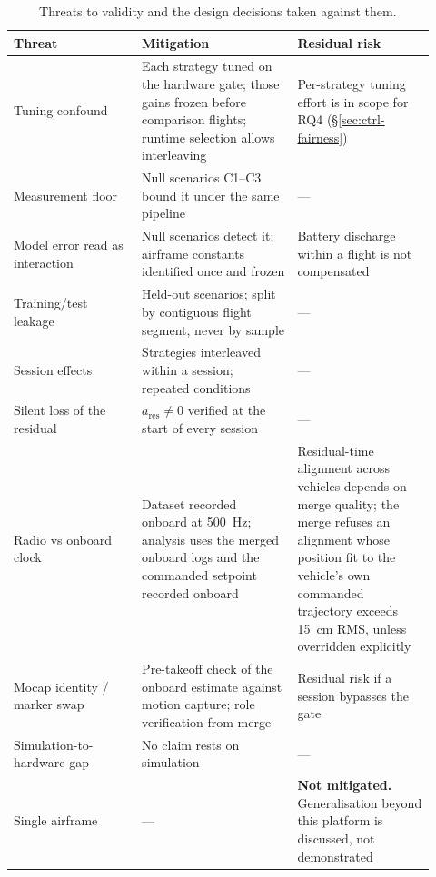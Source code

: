 \begin{table}[t]
  \centering
  \caption{Threats to validity and the design decisions taken against them.}
  \label{tab:setup-threats}
  \small
  \begin{tabular}{@{}p{0.28\linewidth}p{0.34\linewidth}p{0.30\linewidth}@{}}
    \toprule
    Threat & Mitigation & Residual risk \\
    \midrule
    Tuning confound & Each strategy tuned on the hardware gate; those gains frozen before comparison flights; runtime selection allows interleaving & Per-strategy tuning effort is in scope for RQ4 (§\ref{sec:ctrl-fairness}) \\
    Measurement floor & Null scenarios C1--C3 bound it under the same pipeline & --- \\
    Model error read as interaction & Null scenarios detect it; airframe constants identified once and frozen & Battery discharge within a flight is not compensated \\
    Training/test leakage & Held-out scenarios; split by contiguous flight segment, never by sample & --- \\
    Session effects & Strategies interleaved within a session; repeated conditions & --- \\
    Silent loss of the residual & $a_{\mathrm{res}} \neq 0$ verified at the start of every session & --- \\
    Radio vs onboard clock & Dataset recorded onboard at \SI{500}{\hertz}; analysis uses the merged onboard logs and the commanded setpoint recorded onboard & Residual-time alignment across vehicles depends on merge quality; the merge refuses an alignment whose position fit to the vehicle's own commanded trajectory exceeds \SI{15}{\centi\metre} RMS, unless overridden explicitly \\
    Mocap identity / marker swap & Pre-takeoff check of the onboard estimate against motion capture; role verification from merge & Residual risk if a session bypasses the gate \\
    Simulation-to-hardware gap & No claim rests on simulation & --- \\
    Single airframe & --- & \textbf{Not mitigated.} Generalisation beyond this platform is discussed, not demonstrated \\
    \bottomrule
  \end{tabular}
\end{table}

